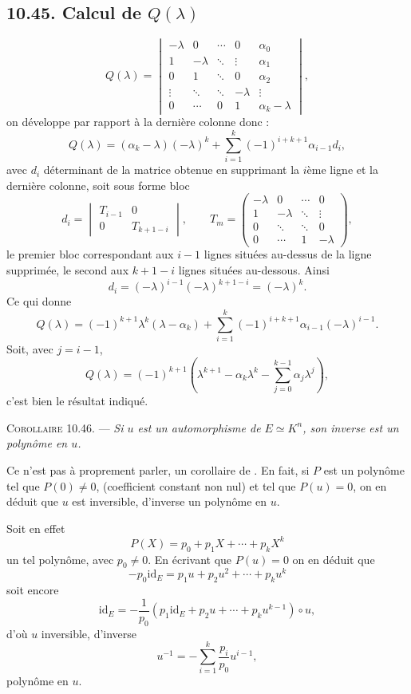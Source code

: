 \subsection*{10.45. Calcul de $Q(\lambda)$}
\[
Q(\lambda)=
\begin{vmatrix}
-\lambda&0&\cdots&0&\alpha_0\\
1&-\lambda&\ddots&\vdots&\alpha_1\\
0&1&\ddots&0&\alpha_2\\
\vdots&\ddots&\ddots&-\lambda&\vdots\\
0&\cdots&0&1&\alpha_k-\lambda
\end{vmatrix},
\]
on développe par rapport à la dernière colonne donc :
\[
Q(\lambda)=(\alpha_k-\lambda)(-\lambda)^k+
\sum_{i=1}^k(-1)^{i+k+1}\alpha_{i-1}d_i,
\]
avec $d_i$ déterminant de la matrice obtenue en supprimant la $i$ème ligne et la dernière colonne, soit sous forme bloc
\[
d_i=
\begin{vmatrix}
T_{i-1}&0\\
0&T_{k+1-i}
\end{vmatrix},
\qquad
T_m=
\begin{pmatrix}
-\lambda&0&\cdots&0\\
1&-\lambda&\ddots&\vdots\\
0&\ddots&\ddots&0\\
0&\cdots&1&-\lambda
\end{pmatrix},
\]
le premier bloc correspondant aux $i-1$ lignes situées au-dessus de la ligne supprimée, le second aux $k+1-i$ lignes situées au-dessous. Ainsi
\[
d_i=(-\lambda)^{i-1}(-\lambda)^{k+1-i}=(-\lambda)^k.
\]
Ce qui donne
\[
Q(\lambda)=(-1)^{k+1}\lambda^k(\lambda-\alpha_k)
+\sum_{i=1}^k(-1)^{i+k+1}\alpha_{i-1}(-\lambda)^{i-1}.
\]
Soit, avec $j=i-1$,
\[
Q(\lambda)=(-1)^{k+1}\left(\lambda^{k+1}-\alpha_k\lambda^k-
\sum_{j=0}^{k-1}\alpha_j\lambda^j\right),
\]
c'est bien le résultat indiqué. \bookend

\medskip\noindent\textsc{Corollaire 10.46.} --- \emph{Si $u$ est un automorphisme de $E\simeq K^n$, son inverse est un polynôme en $u$.}

Ce n'est pas à proprement parler, un corollaire de . En fait, si $P$ est un polynôme tel que $P(0)\ne0$, (coefficient constant non nul) et tel que $P(u)=0$, on en déduit que $u$ est inversible, d'inverse un polynôme en $u$.

Soit en effet
\[
P(X)=p_0+p_1X+\cdots+p_kX^k
\]
un tel polynôme, avec $p_0\ne0$. En écrivant que $P(u)=0$ on en déduit que
\[
-p_0\mathrm{id}_E=p_1u+p_2u^2+\cdots+p_ku^k
\]
soit encore
\[
\mathrm{id}_E=-\frac1{p_0}(p_1\mathrm{id}_E+p_2u+\cdots+p_ku^{k-1})\circ u,
\]
d'où $u$ inversible, d'inverse
\[
u^{-1}=-\sum_{i=1}^k\frac{p_i}{p_0}u^{i-1},
\]
polynôme en $u$.

